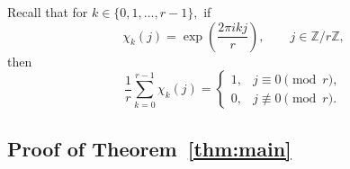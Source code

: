 \documentclass[11pt,reqno]{article}
\numberwithin{equation}{section}
\theoremstyle{plain}
\theoremstyle{definition}
\theoremstyle{remark}
\begin{document}
\medskip\noindent
Recall that for $k\in\{0,1,\dots,r-1\},$ if
\[
  \chi_k(j)=\exp\!\left(\frac{2\pi i k j}{r}\right),
  \qquad j\in\mathbb{Z}/r\mathbb{Z},
\]
then
\[
  \frac{1}{r}\sum_{k=0}^{r-1}\chi_k(j)=
  \begin{cases}
    1, & j\equiv 0\pmod r,\\
    0, & j\not\equiv 0\pmod r.
  \end{cases}
\]

\subsection{Proof of Theorem~\ref{thm:main}}\label{subsec. proof of main thm}
\end{document}
